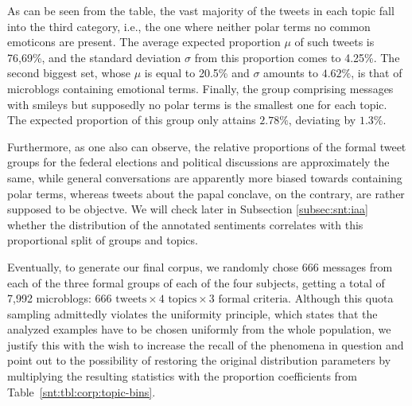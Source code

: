 As can be seen from the table, the vast majority of the tweets in each
topic fall into the third category, i.e., the one where neither polar
terms no common emoticons are present.  The average expected
proportion $\mu$ of such tweets is 76,69\%, and the standard deviation
$\sigma$ from this proportion comes to 4.25\%.  The second biggest
set, whose $\mu$ is equal to 20.5\% and $\sigma$ amounts to $4.62\%$,
is that of microblogs containing emotional terms.  Finally, the group
comprising messages with smileys but supposedly no polar terms is the
smallest one for each topic.  The expected proportion of this group
only attains $2.78\%$, deviating by $1.3\%$.

Furthermore, as one also can observe, the relative proportions of the
formal tweet groups for the federal elections and political
discussions are approximately the same, while general conversations
are apparently more biased towards containing polar terms, whereas
tweets about the papal conclave, on the contrary, are rather supposed
to be objectve.  We will check later in Subsection
\ref{subsec:snt:iaa} whether the distribution of the annotated
sentiments correlates with this proportional split of groups and
topics.

Eventually, to generate our final corpus, we randomly chose 666
messages from each of the three formal groups of each of the four
subjects, getting a total of 7,992 microblogs: $666\text{ tweets}
\times 4\text{ topics} \times 3\text{ formal criteria}$.  Although
this quota sampling admittedly violates the uniformity principle,
which states that the analyzed examples have to be chosen uniformly
from the whole population, we justify this with the wish to increase
the recall of the phenomena in question and point out to the
possibility of restoring the original distribution parameters by
multiplying the resulting statistics with the proportion coefficients
from Table~\ref{snt:tbl:corp:topic-bins}.


